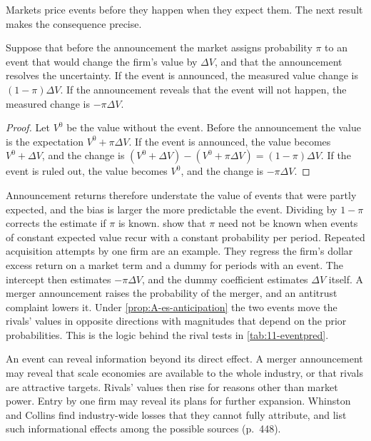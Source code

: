 Markets price events before they happen when they expect them. The next result makes the consequence precise.

\begin{proposition}\label{prop:A-es-anticipation}
Suppose that before the announcement the market assigns probability $\pi$ to an event that would change the firm's
value by $\Delta V$, and that the announcement resolves the uncertainty. If the event is announced, the measured
value change is $(1-\pi)\Delta V$. If the announcement reveals that the event will not happen, the measured change is
$-\pi\Delta V$.
\end{proposition}

\begin{proof}
Let $V^0$ be the value without the event. Before the announcement the value is the expectation
$V^0+\pi\Delta V$. If the event is announced, the value becomes $V^0+\Delta V$, and the change is
$(V^0+\Delta V)-(V^0+\pi\Delta V)=(1-\pi)\Delta V$. If the event is ruled out, the value becomes $V^0$, and the change
is $-\pi\Delta V$.
\end{proof}

Announcement returns therefore understate the value of events that were partly expected, and the bias is larger the
more predictable the event. Dividing by $1-\pi$ corrects the estimate if $\pi$ is known.
\citet[pp.~240--241]{MalatestaThompson1985} show that $\pi$ need not be known when events of constant expected value recur with a
constant probability per period. Repeated acquisition attempts by one firm are an example. They regress the firm's dollar excess
return on a market term and a dummy for periods with an event. The intercept then estimates $-\pi\Delta V$, and the
dummy coefficient estimates $\Delta V$ itself.
A merger announcement raises the probability of the
merger, and an antitrust complaint lowers it. Under \cref{prop:A-es-anticipation} the two events move the rivals'
values in opposite directions with magnitudes that depend on the prior probabilities. This is the logic behind the
rival tests in \cref{tab:11-eventpred}.

An event can reveal information beyond its direct effect. A merger announcement may reveal that scale economies are
available to the whole industry, or that rivals are attractive targets. Rivals' values then rise for reasons other
than market power. Entry by one firm may reveal its plans for further expansion. Whinston and Collins find
industry-wide losses that they cannot fully attribute, and list such informational effects among the possible
sources (p.~448).

